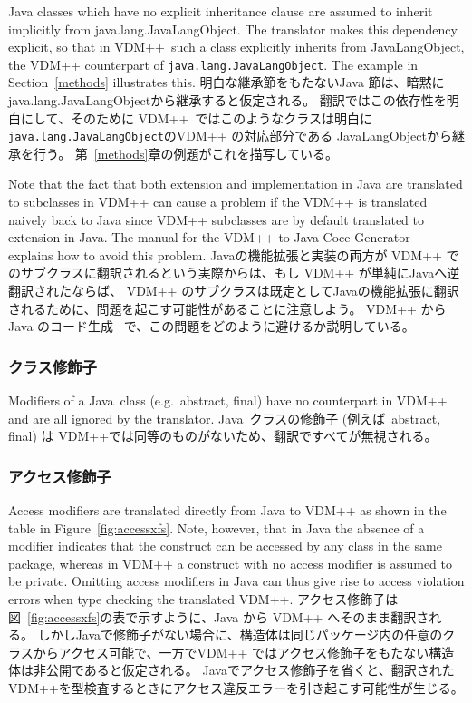 \documentclass[\pformat,12pt]{jarticle}
\newcommand{\JAVA}{Java}
\newcommand{\VDM}{VDM++}
\begin{document}
Java classes which have no explicit inheritance clause are assumed to
inherit implicitly from java.lang.JavaLangObject. The translator makes this
dependency explicit, so that in \VDM\ such a class explicitly inherits
from JavaLangObject, the VDM++ counterpart of
\texttt{java.lang.JavaLangObject}. The example in Section~\ref{methods}
illustrates this.
明白な継承節をもたないJava 節は、暗黙に java.lang.JavaLangObjectから継承すると仮定される。
翻訳ではこの依存性を明白にして、そのために \VDM\ ではこのようなクラスは明白に \texttt{java.lang.JavaLangObject}のVDM++ の対応部分である JavaLangObjectから継承を行う。
第~\ref{methods}章の例題がこれを描写している。

Note that the fact that both extension and implementation in Java are
translated to subclasses in VDM++ can cause a problem if the VDM++ is
translated naively back to Java since VDM++ subclasses are by default
translated to extension in Java. The manual for the VDM++ to Java Coce
Generator~\cite{CGJavaManPP-SCSK} explains how to avoid this problem. 
Javaの機能拡張と実装の両方が VDM++ でのサブクラスに翻訳されるという実際からは、もし VDM++ が単純にJavaへ逆翻訳されたならば、 VDM++ のサブクラスは既定としてJavaの機能拡張に翻訳されるために、問題を起こす可能性があることに注意しよう。
 VDM++ から Java のコード生成~\cite{CGJavaManPP-SCSK} で、この問題をどのように避けるか説明している。 

\subsubsection{クラス修飾子}

Modifiers of a \JAVA\ class (e.g.\ abstract, final) have no
counterpart in VDM++ and are all ignored by the translator. 
 \JAVA\ クラスの修飾子 (例えば\ abstract, final) は VDM++では同等のものがないため、翻訳ですべてが無視される。

\subsubsection{アクセス修飾子}

Access modifiers are translated directly from Java to VDM++ as shown
in the table in Figure~\ref{fig:accessxfs}. Note, however, that in Java the absence
of a modifier indicates that the construct can be accessed by any
class in the same package, whereas in VDM++ a construct with no access
modifier is assumed to be private. Omitting access modifiers in Java
can thus give rise to access violation errors when type checking the
translated VDM++. 
アクセス修飾子は 図~\ref{fig:accessxfs}の表で示すように、Java から VDM++ へそのまま翻訳される。
しかしJavaで修飾子がない場合に、構造体は同じパッケージ内の任意のクラスからアクセス可能で、一方でVDM++ ではアクセス修飾子をもたない構造体は非公開であると仮定される。
Javaでアクセス修飾子を省くと、翻訳された VDM++を型検査するときにアクセス違反エラーを引き起こす可能性が生じる。
\end{document}
